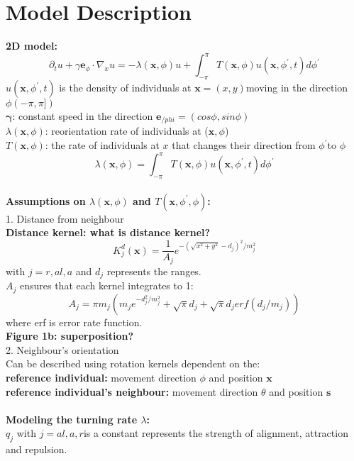 \documentclass{article}
\begin{document}
\section{Model Description}
\textbf{\large {2D model:}}
$$\partial_t u 
+\gamma \boldsymbol{e}_\phi \cdot \nabla_x u
=-\lambda(\boldsymbol{x}, \phi)u
+\int_{-\pi}^{\pi}T(\boldsymbol{x},\phi)u(\boldsymbol{x},\phi^{'},t)d\phi^'$$
$u(\boldsymbol{x},\phi^{'},t)$ is the density of individuals at $\boldsymbol{x}=(x,y)$moving in the direction $\phi (-\pi,\pi])$ \\
$\boldsymbol{\gamma}$: constant speed in the direction $\boldsymbol{e}_{/phi}=(cos\phi,sin\phi)$ \hspace{1cm}\\
$\lambda(\boldsymbol{x}, \phi)$: reorientation rate of individuals at ($\boldsymbol{x},\phi$)\\
$T(\boldsymbol{x},\phi)$: the rate of individuals at $x$ that changes their direction from $\phi^'$to $\phi$
$$\lambda(\boldsymbol{x}, \phi)=\int_{-\pi}^{\pi}T(\boldsymbol{x},\phi)u(\boldsymbol{x},\phi^{'},t)d\phi^'$$
\\
\noindent
\textbf{\large {Assumptions on $\lambda(\boldsymbol{x},\phi)$ and $T(\boldsymbol{x},\phi^{'},\phi)$}:}\\
\noindent
\large{1. Distance from neighbour}\\
{\color{blue} \textbf{Distance kernel: what is distance kernel?}}\\
$$K^d_j(\boldsymbol{x})=\frac{1}{A_j}e^{-(\sqrt{x^2+y^2}-d_{j})^2/m^2_j}$$ with $j=r,al,a$ and $d_j$ represents the ranges. \\
$A_j$ ensures that each kernel integrates to 1:
$$A_{j}=\pi m_{j}(m_{j}e^{-d_{j}^{2}/m_{j}^{2}}+\sqrt{\pi}d_{j}+\sqrt{\pi}d_{j}erf(d_{j}/m_{j}))$$
where erf is error rate function. \\
{\color{blue} \textbf{Figure 1b: superposition?}}\\
\noindent
\large {2. Neighbour's orientation}\\
Can be described using rotation kernels dependent on the:\\
\textbf{ reference individual: }movement direction $\phi$ and position $\boldsymbol{x}$\\
\textbf{ reference individual's neighbour: }movement direction $\theta$ and position $\boldsymbol{s}$\\
\\
\noindent
\textbf{\large {Modeling the turning rate $\lambda$}:}\\
$q_j$ with $j=al,a,r$is a constant represents the strength of alignment, attraction and repulsion.
\end{document}
